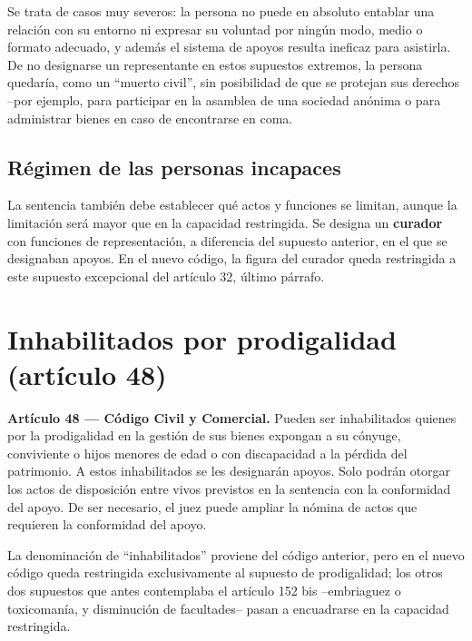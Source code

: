 \documentclass[12pt,oneside]{book}
\begin{document}

Se trata de casos muy severos: la persona no puede en absoluto entablar una relación con su entorno ni expresar su voluntad por ningún modo, medio o formato adecuado, y además el sistema de apoyos resulta ineficaz para asistirla. De no designarse un representante en estos supuestos extremos, la persona quedaría, como un ``muerto civil'', sin posibilidad de que se protejan sus derechos --por ejemplo, para participar en la asamblea de una sociedad anónima o para administrar bienes en caso de encontrarse en coma.

\subsection{Régimen de las personas incapaces}

La sentencia también debe establecer qué actos y funciones se limitan, aunque la limitación será mayor que en la capacidad restringida. Se designa un \textbf{curador} con funciones de representación, a diferencia del supuesto anterior, en el que se designaban apoyos. En el nuevo código, la figura del curador queda restringida a este supuesto excepcional del artículo 32, último párrafo.

\section{Inhabilitados por prodigalidad (artículo 48)}

\begin{important}
\textbf{Artículo 48 --- Código Civil y Comercial.} Pueden ser inhabilitados quienes por la prodigalidad en la gestión de sus bienes expongan a su cónyuge, conviviente o hijos menores de edad o con discapacidad a la pérdida del patrimonio. A estos inhabilitados se les designarán apoyos. Solo podrán otorgar los actos de disposición entre vivos previstos en la sentencia con la conformidad del apoyo. De ser necesario, el juez puede ampliar la nómina de actos que requieren la conformidad del apoyo.
\end{important}

La denominación de ``inhabilitados'' proviene del código anterior, pero en el nuevo código queda restringida exclusivamente al supuesto de prodigalidad; los otros dos supuestos que antes contemplaba el artículo 152 bis --embriaguez o toxicomanía, y disminución de facultades-- pasan a encuadrarse en la capacidad restringida.
\end{document}
